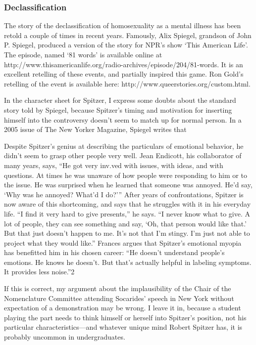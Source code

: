 \begin{refsection}
\subsubsection{Declassification}
\label{declassification}

The story of the declassification of homosexuality as a mental illness has been retold a couple of times in recent years. Famously, Alix Spiegel, grandson of John P. Spiegel, produced a version of the story for NPR's show `This American Life'. The episode, named `81 words' is available online at http:\slash \slash www.thisamericanlife.org\slash radio-archives\slash episode\slash 204\slash 81-words. It is an excellent retelling of these events, and partially inspired this game. Ron Gold's retelling of the event is available here: http:\slash \slash www.queerstories.org\slash custom.html.

In the character sheet for Spitzer, I express some doubts about the standard story told by Spiegel, because Spitzer's timing and motivation for inserting himself into the controversy doesn't seem to match up for normal person. In a 2005 issue of The New Yorker Magazine, Spiegel writes that 

Despite Spitzer's genius at describing the particulars of emotional behavior, he didn't seem to grasp other people very well. Jean Endicott, his collaborator of many years, says, ``He got very inv.ved with issues, with ideas, and with questions. At times he was unaware of how people were responding to him or to the issue. He was surprised when he learned that someone was annoyed. He'd say, `Why was he annoyed? What'd I do?''' After years of confrontations, Spitzer is now aware of this shortcoming, and says that he struggles with it in his everyday life. ``I find it very hard to give presents,'' he says. ``I never know what to give. A lot of people, they can see something and say, `Oh, that person would like that.' But that just doesn't happen to me. It's not that I'm stingy. I'm just not able to project what they would like.'' Frances argues that Spitzer's emotional myopia has benefitted him in his chosen career: ``He doesn't understand people's emotions. He knows he doesn't. But that's actually helpful in labeling symptoms. It provides less noise.''2

If this is correct, my argument about the implausibility of the Chair of the Nomenclature Committee attending Socarides' speech in New York without expectation of a demonstration may be wrong. I leave it in, because a student playing the part needs to think himself or herself into Spitzer's position, not his particular characteristics---and whatever unique mind Robert Spitzer has, it is probably uncommon in undergraduates.


\end{refsection}
